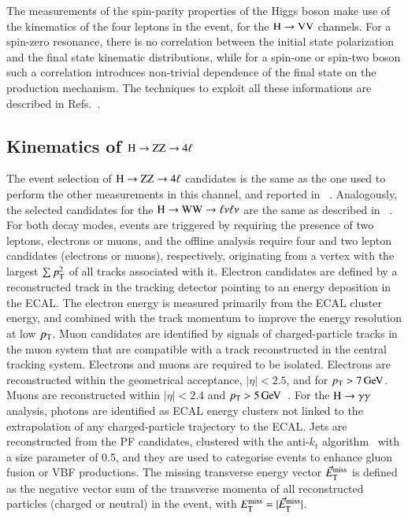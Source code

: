 The measurements of the spin-parity properties of the Higgs boson make
use of the kinematics of the four leptons in the event, for the
$\mathrm{H}\to\mathrm{V}\mathrm{V}$ channels.  For a spin-zero resonance, there is no
correlation between the initial state polarization and the final state
kinematic distributions, while for a spin-one or spin-two boson such a
correlation introduces non-trivial dependence of the final state on
the production mechanism.  The techniques to exploit all these
informations are described in
Refs.~\cite{Soni:1993jc,Barger:1993wt,Choi:2002jk,Choi:2002jk,
  Buszello:2002uu,Godbole:2007cn,Keung:2008ve,Antipin:2008hj,Hagiwara:2009wt,
  Gao:2010qx,DeRujula:2010ys,Gainer:2011xz, Bolognesi:2012mm,
  Chen:2012jy,Anderson:2013afp,Gainer:2013rxa}.

\subsection{Kinematics of $\mathrm{H}\to\mathrm{Z}\mathrm{Z}\to4\ell$}
\label{sec:hzzkinematics}
The event selection of $\mathrm{H}\to\mathrm{Z}\mathrm{Z}\to4\ell$ candidates is the same as the one
used to perform the other measurements in this channel, and reported
in ~\cite{Chatrchyan:2013mxa+}. Analogously, the selected candidates
for the $\mathrm{H}\to\mathrm{W}\mathrm{W}\to\ell\nu\ell\nu$ are the same as described in
~\cite{Chatrchyan:2013iaa}. For both decay modes, events are triggered
by requiring the presence of two leptons, electrons or muons, and the
offline analysis require four and two lepton candidates (electrons or
muons), respectively, originating from a vertex with the largest $\sum
p_{\mathrm{T}}^2$ of all tracks associated with it.  Electron candidates are
defined by a reconstructed track in the tracking detector pointing to
an energy deposition in the ECAL.  The electron energy is measured
primarily from the ECAL cluster energy, and combined with the track
momentum to improve the energy resolution at low $p_{\mathrm{T}}$.  Muon
candidates are identified by signals of charged-particle tracks in the
muon system that are compatible with a track reconstructed in the
central tracking system.  Electrons and muons are required to be
isolated. Electrons are reconstructed within the geometrical
acceptance, $|\eta| < 2.5$, and for $p_{\mathrm{T}} > 7\,\mathrm{Ge\hspace{-.08em}V}$. Muons are
reconstructed within $|\eta| < 2.4$ and $p_{\mathrm{T}} >
5\,\mathrm{Ge\hspace{-.08em}V}$~\cite{Chatrchyan:2012xi}.  For the $\mathrm{H}\to\gamma\gamma$ analysis, photons
are identified as ECAL energy clusters not linked to the extrapolation
of any charged-particle trajectory to the ECAL.  Jets are
reconstructed from the PF candidates, clustered with the anti-$k_t$
algorithm~\cite{Cacciari:2008gp, Cacciari:2011ma} with a size
parameter of 0.5, and they are used to categorise events to enhance
gluon fusion or VBF productions. The missing transverse energy vector
$\vec{E}_\mathrm{T}^{\mathrm{miss}}$ is defined as the negative vector sum of the transverse
momenta of all reconstructed particles (charged or neutral) in the
event, with $E_{\mathrm{T}}^{\mathrm{miss}} = |\vec{E}_\mathrm{T}^{\mathrm{miss}}|$.

